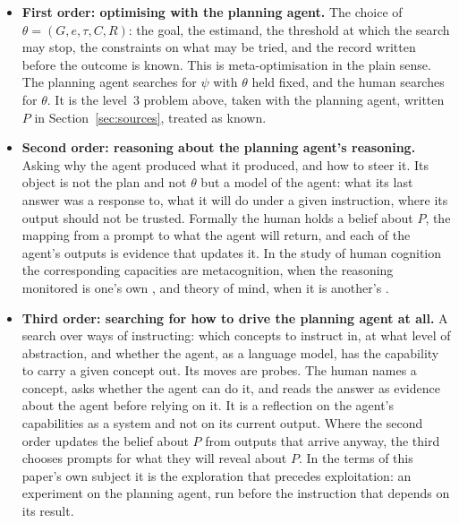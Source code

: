 \documentclass[11pt,a4paper]{article}
\begin{document}
\begin{itemize}
\item \textbf{First order: optimising with the planning agent.} The choice of $\theta = (G, e, \tau, C, R)$: the goal, the estimand, the threshold at which the search may stop, the constraints on what may be tried, and the record written before the outcome is known. This is meta-optimisation in the plain sense. The planning agent searches for $\psi$ with $\theta$ held fixed, and the human searches for $\theta$. It is the level~3 problem above, taken with the planning agent, written $P$ in Section~\ref{sec:sources}, treated as known.
\item \textbf{Second order: reasoning about the planning agent's reasoning.} Asking why the agent produced what it produced, and how to steer it. Its object is not the plan and not $\theta$ but a model of the agent: what its last answer was a response to, what it will do under a given instruction, where its output should not be trusted. Formally the human holds a belief about $P$, the mapping from a prompt to what the agent will return, and each of the agent's outputs is evidence that updates it. In the study of human cognition the corresponding capacities are metacognition, when the reasoning monitored is one's own \citep{flavell1979}, and theory of mind, when it is another's \citep{premack1978}.
\item \textbf{Third order: searching for how to drive the planning agent at all.} A search over ways of instructing: which concepts to instruct in, at what level of abstraction, and whether the agent, as a language model, has the capability to carry a given concept out. Its moves are probes. The human names a concept, asks whether the agent can do it, and reads the answer as evidence about the agent before relying on it. It is a reflection on the agent's capabilities as a system and not on its current output. Where the second order updates the belief about $P$ from outputs that arrive anyway, the third chooses prompts for what they will reveal about $P$. In the terms of this paper's own subject it is the exploration that precedes exploitation: an experiment on the planning agent, run before the instruction that depends on its result.
\end{itemize}
\end{document}
